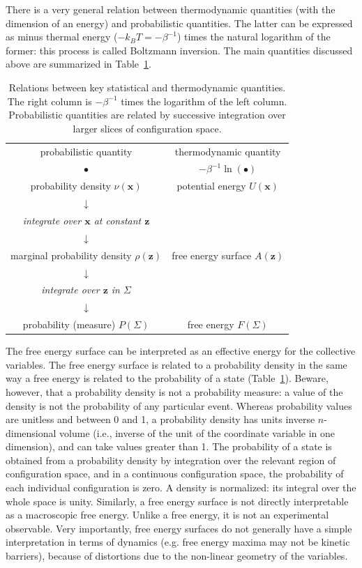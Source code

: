 \documentclass[9pt,review]{livecoms}
\newcommand{\vx}{\mathbf{x}}
\newcommand{\vz}{\mathbf{z}}
\begin{document}
There is a very general relation between thermodynamic quantities (with the dimension of an energy) and probabilistic quantities.
The latter can be expressed as minus thermal energy ($-k_B T = -\beta^{-1}$) times the natural logarithm of the former: this process is called Boltzmann inversion.
The main quantities discussed above are summarized in Table~\ref{tab:quantities}.


\begin{table}[]
\small
    \centering
\begin{tabular}{c|c}
probabilistic quantity & thermodynamic quantity  \\
$\bullet$ &   $-\beta^{-1} \ln(\bullet)$ \\
\hline
probability density $\nu(\vx)$  & potential energy  $U(\vx)$\\
$\downarrow$ &  \\
\textit{integrate over $\vx$ at constant $\vz$} & \\
$\downarrow$ &  \\
marginal probability density $\rho(\vz)$ & free energy surface $A(\vz)$ \\
$\downarrow$ &  \\
\textit{integrate over $\vz$ in $\Sigma$} & \\
$\downarrow$ &  \\
probability (measure) $P(\Sigma)$  & free energy  $F(\Sigma)$\\
\end{tabular}
    \caption{Relations between key statistical and thermodynamic quantities.
    The right column is $-\beta^{-1}$ times the logarithm of the left column.
    Probabilistic quantities are related by successive integration over larger slices of configuration space.}
    \label{tab:quantities}
\end{table}


The free energy surface can be interpreted as an effective energy for the collective variables.
The free energy surface is related to a probability density in the same way a free energy is related to the probability of a state (Table~\ref{tab:quantities}).
Beware, however, that a probability density is not a probability measure: a value of the density is not the probability of any particular event.
Whereas probability values are unitless and between 0 and 1, a probability density has units inverse $n$-dimensional volume (i.e., inverse of the unit of the coordinate variable in one dimension), and can take values greater than 1. The probability of a state is obtained from a probability density by integration over the relevant region of configuration space, and in a continuous configuration space, the probability of each individual configuration is zero.
A density is normalized: its integral over the whole space is unity.
Similarly, a free energy surface is not directly interpretable as a macroscopic free energy. Unlike a free energy, it is not an experimental observable.
Very importantly, free energy surfaces do not generally have a simple interpretation in terms of dynamics (e.g. free energy maxima may not be kinetic barriers), because of distortions due to the non-linear geometry of the variables.
\end{document}
